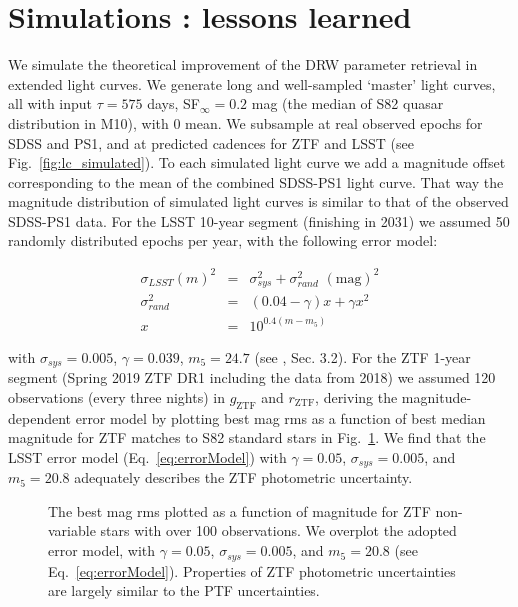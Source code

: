 \documentclass[twocolumn]{aastex62}
\begin{document}
%
%
%
%
%

\section{Simulations : lessons learned}\label{sec:simulation}

We simulate the theoretical improvement of the DRW parameter retrieval in extended light curves. We generate long and well-sampled  `master' light curves, all with input $\tau = 575 $ days, SF$_{\infty} = 0.2$ mag (the median of S82 quasar distribution in M10), with 0 mean.  We subsample at real observed epochs for SDSS and PS1, and at predicted cadences for ZTF and LSST  (see Fig.~\ref{fig:lc_simulated}). To each simulated light curve we add a magnitude offset corresponding to the mean of the combined SDSS-PS1 light curve. That way the magnitude distribution of simulated light curves is similar to that of the observed SDSS-PS1 data. For the LSST 10-year segment (finishing in 2031) we assumed 50 randomly distributed  epochs per year, with the following error model:

\begin{eqnarray}
\label{eq:errorModel}
\sigma_{LSST}(m)^{2} &=& \sigma_{sys}^{2} + \sigma_{rand}^{2} \,\, \mathrm{(mag)}^{2} \\
\sigma_{rand}^{2} &=& (0.04-\gamma)x + \gamma x^{2} \nonumber \\
x &=& 10^{0.4(m-m_{5})} \nonumber
\end{eqnarray}

with  $\sigma_{sys} = 0.005$, $\gamma=0.039$, $m_{5} = 24.7$ (see \citealt{ivezic2019}, Sec. 3.2).
For the ZTF 1-year segment (Spring 2019 ZTF DR1 including the data from 2018) we assumed 120 observations (every three nights) in $g_{\mathrm{ZTF}}$ and $r_{\mathrm{ZTF}}$, deriving the magnitude-dependent error model by plotting best mag rms as a function of best median magnitude for ZTF matches to S82 standard stars in Fig.~\ref{fig:ztf_errors}. We find that the LSST error model (Eq.~\ref{eq:errorModel}) with $\gamma = 0.05$, $\sigma_{sys} = 0.005 $, and $m_{5} = 20.8$ adequately describes the ZTF photometric uncertainty. 


\begin{figure}
	\caption{The best mag rms plotted as a function of magnitude for ZTF non-variable stars with over 100 observations. We overplot the adopted error model, with $\gamma = 0.05$, $\sigma_{sys} = 0.005 $, and $m_{5} = 20.8$ (see Eq.~\ref{eq:errorModel}). Properties of ZTF photometric uncertainties are largely similar to the PTF uncertainties.}
	\label{fig:ztf_errors}
\end{figure} 
\end{document}
